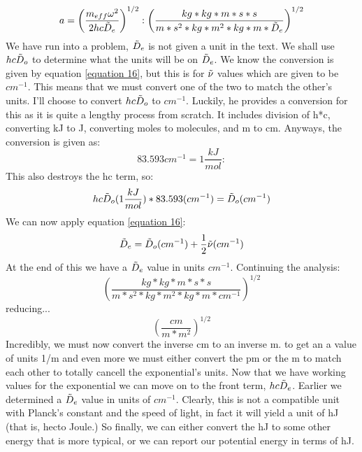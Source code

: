 \documentclass[letterpaper,12pt]{article}
\begin{document}
\begin{tcolorbox}[breakable,title=Units, height fixed for=first and middle]
\begin{equation}
    a=\left(\frac{m_{eff}\omega^2}{2hc\Tilde{D}_e}\right)^{1/2}:\left(\frac{kg*kg*m*s*s}{m*s^2*kg*m^2*kg*m*\Tilde{D}_e}\right)^{1/2}
\end{equation}
We have run into a problem, $\Tilde{D}_e$ is not given a unit in the text. We shall use $hc\Tilde{D}_o$ to determine what the units will be on $\Tilde{D}_e$. We know the conversion is given by equation \ref{equation 16}, but this is for $\Tilde{\nu}$ values which are given to be $cm^{-1}$. This means that we must convert one of the two to match the other's units. I'll choose to convert $hc\Tilde{D}_o$ to $cm^{-1}$. Luckily, he provides a conversion for this as it is quite a lengthy process from scratch. It includes division of h*c, converting kJ to J, converting moles to molecules, and m to cm. Anyways, the conversion is given as:
\begin{equation}
    83.593cm^{-1}=1\frac{kJ}{mol}:
\end{equation}
This also destroys the hc term, so:
\begin{equation}
    hc\Tilde{D}_o(1\frac{kJ}{mol})*83.593(cm^{-1})=\Tilde{D}_o(cm^{-1})
\end{equation}
We can now apply equation \ref{equation 16}:
\begin{equation}
    \Tilde{D}_e=\Tilde{D}_o(cm^{-1})+\frac{1}{2}\Tilde{\nu}(cm^{-1})
\end{equation}
At the end of this we have a $\Tilde{D}_e$ value in units $cm^{-1}$. Continuing the analysis:
\begin{equation}
    \left(\frac{kg*kg*m*s*s}{m*s^2*kg*m^2*kg*m*cm^{-1}}\right)^{1/2}
\end{equation}
reducing...
\begin{equation}
    \left(\frac{cm}{m*m^2}\right)^{1/2}
\end{equation}
Incredibly, we must now convert the inverse cm to an inverse m. to get an a value of units 1/m and even more we must either convert the pm or the m to match each other to totally cancell the exponential's units. \newline
Now that we have working values for the exponential we can move on to the front term, $hc\Tilde{D}_e$. Earlier we determined a $\Tilde{D}_e$ value in units of $cm^{-1}$. Clearly, this is not a compatible unit with Planck's constant and the speed of light, in fact it will yield a unit of hJ (that is, hecto Joule.) So finally, we can either convert the hJ to some other energy that is more typical, or we can report our potential energy in terms of hJ.\newline

\end{tcolorbox}
\end{document}
